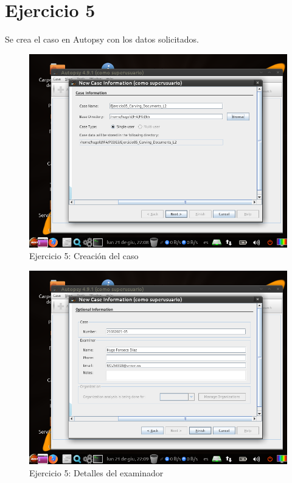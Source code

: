 \documentclass[11pt]{article}
\begin{document}
\section{Ejercicio 5}
Se crea el caso en Autopsy con los datos solicitados.

\begin{figure}[H]
    \caption{Ejercicio 5: Creación del caso}
    \centering
    \includegraphics[scale=0.7]{e5-1.png}
\end{figure}

\begin{figure}[H]
    \caption{Ejercicio 5: Detalles del examinador}
    \centering
    \includegraphics[scale=0.7]{e5-2.png}
\end{figure}
\end{document}

